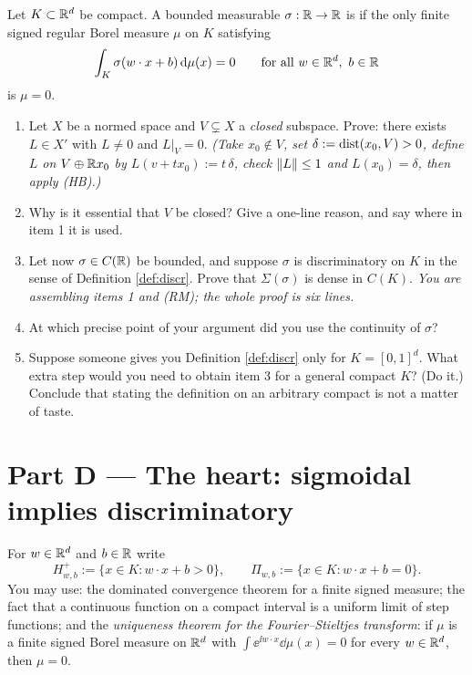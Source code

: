 \documentclass[11pt,a4paper]{article}
\begin{document}
\begin{definition}[Discriminatory]\label{def:discr}
Let $K \subset \mathbb{R}^d$ be compact. A bounded measurable $\sigma : \mathbb{R}\to\mathbb{R}$ is  if the only finite signed regular Borel measure $\mu$ on $K$ satisfying
\[
\int_K \sigma(w\cdot x + b)\,\mathrm{d}\mu(x) = 0 \qquad \text{for all } w\in\mathbb{R}^d,\ b \in \mathbb{R}
\]
is $\mu = 0$.
\end{definition}

\begin{exercise}\label{ex:skeleton}
\leavevmode
\begin{enumerate}[label=\textbf{\arabic*.}]
\item Let $X$ be a normed space and $V \subsetneq X$ a \emph{closed} subspace. Prove: there exists
$L \in X'$ with $L \ne 0$ and $L|_V = 0$.
\emph{(Take $x_0 \notin V$, set $\delta := \operatorname{dist}(x_0,V) > 0$, define $L$ on $V \oplus \mathbb{R} x_0$ by
$L(v + t x_0) := t\,\delta$, check $\left\lVert L \right\rVert \le 1$ and $L(x_0) = \delta$, then apply \textup{(HB)}.)}
\item Why is it essential that $V$ be closed? Give a one-line reason, and say where in item 1 it is
used.
\item Let now $\sigma \in C(\mathbb{R})$ be bounded, and suppose $\sigma$ is discriminatory on $K$ in the
sense of Definition \ref{def:discr}. Prove that $\Sigma(\sigma)$ is dense in $C(K)$.
\emph{You are assembling items 1 and \textup{(RM)}; the whole proof is six lines.}
\item At which precise point of your argument did you use the continuity of $\sigma$?
\item Suppose someone gives you Definition \ref{def:discr} only for $K = [0,1]^d$. What extra step
would you need to obtain item 3 for a general compact $K$? (Do it.) Conclude that stating the
definition on an arbitrary compact is not a matter of taste.
\end{enumerate}
\end{exercise}

\section{Part D --- The heart: sigmoidal implies discriminatory}

\begin{setting}
For $w \in \mathbb{R}^d$ and $b \in \mathbb{R}$ write
\[
H^+_{w,b} := \{x \in K : w\cdot x + b > 0\}, \qquad
\Pi_{w,b} := \{x \in K : w\cdot x + b = 0\} .
\]
You may use: the dominated convergence theorem for a finite signed measure; the fact that a
continuous function on a compact interval is a uniform limit of step functions; and the
\emph{uniqueness theorem for the Fourier--Stieltjes transform}: if $\mu$ is a finite signed Borel
measure on $\mathbb{R}^d$ with $\int \ee^{\ii w\cdot x}\dd\mu(x) = 0$ for every $w \in \mathbb{R}^d$, then $\mu = 0$.
\end{setting}
\end{document}
